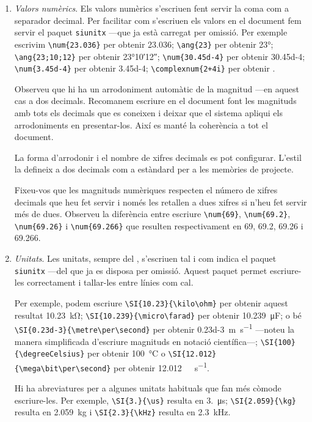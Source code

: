 \documentclass{tfgitic}[2024/07/01]
\begin{document}
\begin{enumerate}
\item \emph{Valors numèrics}. Els valors numèrics s'escriuen fent
  servir la coma com a separador decimal. Per facilitar com
  s'escriuen els valors en el document fem servir el paquet
  \texttt{siunitx} ---que ja està carregat per omissió. Per exemple
  escrivim \verb!\num{23.036}! per obtenir \num{23.036};
  \verb!\ang{23}! per obtenir \ang{23}; \verb!\ang{23;10;12}!  per
  obtenir \ang{23;10;12}; \verb!\num{30.45d-4}! per obtenir
  \num{30.45d-4}; \verb!\num{3.45d-4}!  per obtenir \num{3.45d-4};
  \verb!\complexnum{2+4i}!  per obtenir .

  Observeu que hi ha un arrodoniment automàtic de la magnitud ---en
  aquest cas a dos decimals. Recomanem escriure en el document font
  les magnituds amb tots els decimals que es coneixen i deixar que el
  sistema apliqui els arrodoniments en presentar-los. Així es manté la
  coherència a tot el document.

  La forma d'arrodonir i el nombre de xifres decimals es pot
  configurar. L'estil la defineix a dos decimals com a estàndard per a
  les memòries de projecte.

  Fixeu-vos que les magnituds numèriques respecten el número de xifres
  decimals que heu fet servir i només les retallen a dues xifres si
  n'heu fet servir més de dues. Observeu la diferència entre escriure
  \verb!\num{69}!, \verb!\num{69.2}!, \verb!\num{69.26}! i
  \verb!\num{69.266}! que resulten respectivament en \num{69},
  \num{69.2}, \num{69.26} i \num{69.266}.

\item \emph{Unitats}. Les unitats, sempre del , s'escriuen
  tal i com indica el paquet \texttt{siunitx} ---del que ja es disposa
  per omissió. Aquest paquet permet escriure-les correctament i
  tallar-les entre línies com cal.

  Per exemple, podem escriure \verb!\SI{10.23}{\kilo\ohm}! per obtenir
  aquest resultat \SI{10.23}{\kilo\ohm};
  \verb!\SI{10.239}{\micro\farad}! per obtenir
  \SI{10.239}{\micro\farad}; o bé
  \verb!\SI{0.23d-3}{\metre\per\second}!  per obtenir
  \SI{0.23d-3}{\metre\per\second} ---noteu la manera simplificada
  d'escriure magnituds en notació científica---;
  \verb|\SI{100}{\degreeCelsius}| per obtenir \SI{100}{\degreeCelsius}
  o \verb!\SI{12.012}{\mega\bit\per\second}!  per obtenir
  \SI{12.012}{\mega\bit\per\second}.

  Hi ha abreviatures per a algunes unitats habituals que fan més
  còmode escriure-les. Per exemple, \verb|\SI{3.}{\us}| resulta en
  \SI{3.}{\us}; \verb|\SI{2.059}{\kg}| resulta en \SI{2.059}{\kg} i
  \verb|\SI{2.3}{\kHz}| resulta en \SI{2.3}{\kHz}.


\end{enumerate}
\end{document}
